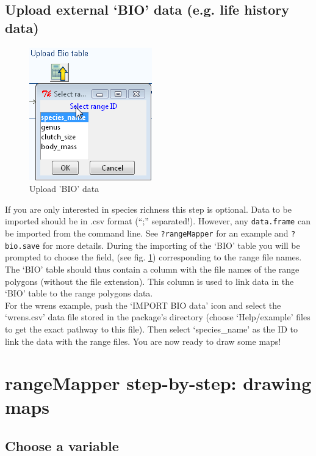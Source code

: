 \documentclass[ a4paper ]{article}
\begin{document}
	\subsection{ Upload external `BIO' data (e.g. life history data)}
	\begin{figure}[htbp]
	  \begin{center}
		\includegraphics[width=0.5\linewidth]{fig6}
		\caption{\label{fig:fig6} Upload 'BIO' data}
	  \end{center}
	\end{figure}
	
If you are only  interested in species richness this step is optional. Data to be imported should be in .csv format (``;'' separated!). However, any \texttt{data.frame} can be imported from the command line. See \texttt{?rangeMapper} for an example and \texttt{?bio.save} for more details. During the importing of the `BIO' table you will be prompted to choose  the field, (see fig. \ref{fig:fig6}) corresponding to the range file names. The `BIO' table should thus contain a column with the file names of the range polygons (without the file extension). This column is used to link data in the `BIO' table to the range polygons data. \\ For the wrens example, push the `IMPORT BIO data' icon and select the `wrens.csv' data file stored in the package's directory (choose `Help/example' files to get the exact pathway to this file). Then select `species\_name' as the ID to link the data with the range files. You are now ready to draw some maps!

\section{rangeMapper step-by-step: drawing maps}		
	\subsection{ Choose a variable}
	
\end{document}
